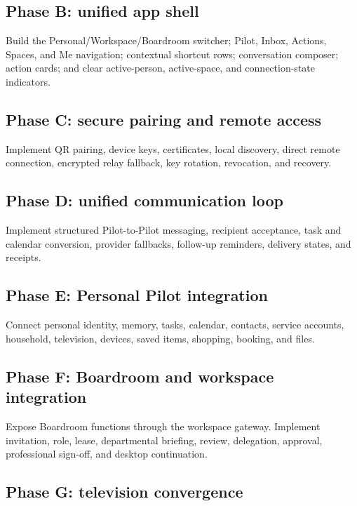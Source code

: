 \documentclass[11pt,a4paper]{article}
\begin{document}
\subsection{Phase B: unified app shell}

Build the Personal/Workspace/Boardroom switcher; Pilot, Inbox, Actions, Spaces,
and Me navigation; contextual shortcut rows; conversation composer; action
cards; and clear active-person, active-space, and connection-state indicators.

\subsection{Phase C: secure pairing and remote access}

Implement QR pairing, device keys, certificates, local discovery, direct remote
connection, encrypted relay fallback, key rotation, revocation, and recovery.

\subsection{Phase D: unified communication loop}

Implement structured Pilot-to-Pilot messaging, recipient acceptance, task and
calendar conversion, provider fallbacks, follow-up reminders, delivery states,
and receipts.

\subsection{Phase E: Personal Pilot integration}

Connect personal identity, memory, tasks, calendar, contacts, service accounts,
household, television, devices, saved items, shopping, booking, and files.

\subsection{Phase F: Boardroom and workspace integration}

Expose Boardroom functions through the workspace gateway.  Implement invitation,
role, lease, departmental briefing, review, delegation, approval, professional
sign-off, and desktop continuation.

\subsection{Phase G: television convergence}
\end{document}
